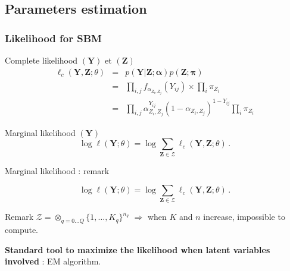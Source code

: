 \documentclass[compress,10pt]{beamer}
\newcommand{\balpha}{\boldsymbol{\alpha}}
\newcommand{\bY}{\mathbf{Y}}
\newcommand{\bX}{\mathbf{Y}}
\newcommand{\bpi}{\mathbf{\pi}}
\newcommand{\bZ}{\mathbf{Z}}
\begin{document}

\subsection{Parameters estimation}

\begin{frame} \frametitle{Likelihood for SBM}

 \begin{block}{Complete  likelihood $(\bY)$  et  $(\bZ)$}
 \begin{eqnarray}\label{eq:lik}
\ell_c(\bY,\bZ; \theta) &=& p(\bY | \bZ; \balpha) p(\bZ ; \bpi)\nonumber  \\
&=& \prod_{i,j} f_{\alpha_{Z_i,Z_j}}(Y_{ij}) \times   \prod_{i} \pi_{Z_i} \nonumber  \\
&=&  \prod_{i,j} \alpha_{Z_i,Z_j}^{Y_{ij}} (1-  \alpha_{Z_i,Z_j})^{1- Y_{ij}}    \prod_{i} \pi_{Z_i} \nonumber
\end{eqnarray}
 
 \end{block}
 

\begin{block}{Marginal likelihood $(\bY)$}
\begin{equation}\label{eq:vraismarg}
\log \ell(\bY; \theta) =\log \sum_{\bZ \in \boldsymbol{\mathcal{Z}}} \ell_c(\bY,\bZ; \theta) \,.
\end{equation}
 \end{block}
 

 \end{frame}
 

 
 
 

 \begin{frame}{Marginal likelihood  : remark }
 
 $$
\log \ell(\bY; \theta) =\log \sum_{\bZ \in \boldsymbol{\mathcal{Z}}} \ell_c(\bX,\bZ; \theta) \,.
$$
 
  \begin{block}{Remark}
$\boldsymbol{\mathcal{Z}} =  \mathop{\otimes}_{q=0\dots Q} \{1,\dots, K_q\}^{n_q}$ \color{dgreen} $\Rightarrow$ \color{black}  when  $K$ and $n$ increase, impossible to compute. 
 \end{block}
 
\color{dgreen} \textbf{Standard tool to maximize the likelihood when latent variables involved} \color{black} : EM  algorithm.  
 
 \end{frame}
 
\end{document}
